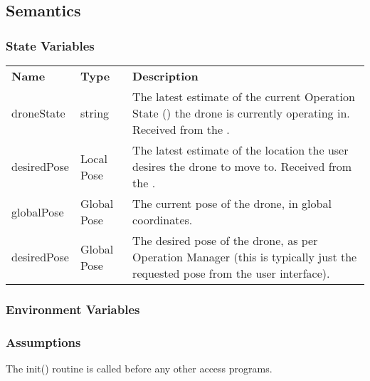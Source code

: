 \documentclass[12pt, titlepage]{article}
\begin{document}
\subsection{Semantics}
\subsubsection{State Variables}
\begin{center}
\begin{tabular}{p{2.5 cm} p{2.5cm} p{8cm} }
\hline
\textbf{Name} & \textbf{Type} & \textbf{Description}  \\
droneState & string & The latest estimate of the current Operation State (\nameref{Operation States}) the drone is currently operating in. Received from the \nameref{Operations Manager}.  \\
desiredPose & Local Pose & The latest estimate of the location the user desires the drone to move to. Received from the \nameref{Operations Manager}. \\
globalPose & Global Pose & The current pose of the drone, in global coordinates.  \\
desiredPose & Global Pose & The desired pose of the drone, as per Operation Manager (this is typically just the requested pose from the user interface).  \\
\hline
\hline
\end{tabular}
\end{center}
\subsubsection{Environment Variables}
\subsubsection{Assumptions}
The init() routine is called before any other access programs.
\end{document}
